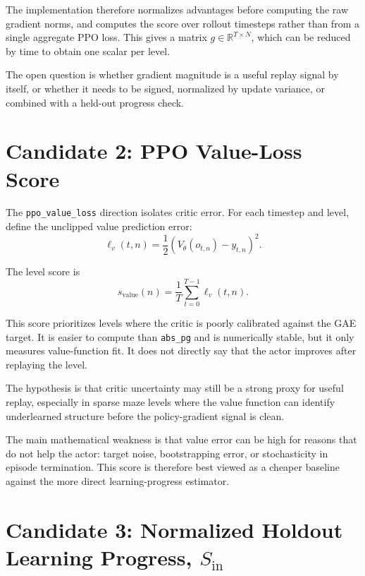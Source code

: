 \documentclass[11pt]{article}
\begin{document}
The implementation therefore normalizes advantages before computing the raw
gradient norms, and computes the score over rollout timesteps rather than from
a single aggregate PPO loss. This gives a matrix $g \in \mathbb{R}^{T \times N}$,
which can be reduced by time to obtain one scalar per level.

The open question is whether gradient magnitude is a useful replay signal by
itself, or whether it needs to be signed, normalized by update variance, or
combined with a held-out progress check.

\section{Candidate 2: PPO Value-Loss Score}

The \texttt{ppo\_value\_loss} direction isolates critic error. For each timestep and
level, define the unclipped value prediction error:
\begin{equation}
  \ell_v(t,n)
    = \frac{1}{2}\left(V_\theta(o_{t,n}) - y_{t,n}\right)^2.
\end{equation}

The level score is
\begin{equation}
  s_{\mathrm{value}}(n)
    = \frac{1}{T}\sum_{t=0}^{T-1}\ell_v(t,n).
\end{equation}

This score prioritizes levels where the critic is poorly calibrated against the
GAE target. It is easier to compute than \texttt{abs\_pg} and is numerically stable,
but it only measures value-function fit. It does not directly say that the
actor improves after replaying the level.

The hypothesis is that critic uncertainty may still be a strong proxy for
useful replay, especially in sparse maze levels where the value function can
identify underlearned structure before the policy-gradient signal is clean.

The main mathematical weakness is that value error can be high for reasons that
do not help the actor: target noise, bootstrapping error, or stochasticity in
episode termination. This score is therefore best viewed as a cheaper baseline
against the more direct learning-progress estimator.

\section{Candidate 3: Normalized Holdout Learning Progress, $S_{\mathrm{in}}$}
\end{document}
